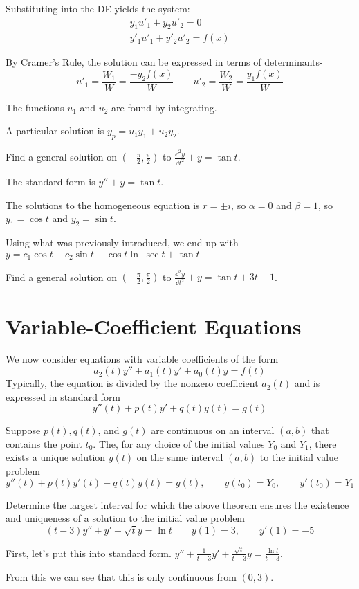 \documentclass[../diffeq.tex]{subfiles}
\begin{document}
Substituting into the DE yields the system:
\begin{align*}
y_1u'_1+y_2u'_2=0 \\
y'_1u'_1+y'_2u'_2 = f(x)
\end{align*}

By Cramer's Rule, the solution can be expressed in terms of determinants- 
\[ u'_1=\frac{W_1}{W}=\frac{-y_2f(x)}{W} \qquad u'_2=\frac{W_2}{W}=\frac{y_1f(x)}{W} \]

The functions $u_1$ and $u_2$ are found by integrating.

A particular solution is $y_p=u_1y_1+u_2y_2$.

\begin{example}
    Find a general solution on $(-\frac{\pi}{2},\frac{\pi}{2})$ to $\frac{\dd^2 y}{\dd t^2}+y=\tan t$.

    The standard form is $y''+y=\tan t$.

    The solutions to the homogeneous equation is $r=\pm i$, so $\alpha = 0$ and $\beta = 1$, so $y_1=\cos t$ and $y_2=\sin t$.

    Using what was previously introduced, we end up with $y=c_1\cos t + c_2\sin t - \cos t \ln|\sec t+\tan t|$
\end{example}

\ex Find a general solution on $(-\frac{\pi}{2},\frac{\pi}{2})$ to $\frac{\dd^2 y}{\dd t^2}+y=\tan t + 3t - 1$.

\section{Variable-Coefficient Equations}
We now consider equations with variable coefficients of the form 
\[ a_2(t)y''+a_1(t)y'+a_0(t)y=f(t) \]
Typically, the equation is divided by the nonzero coefficient $a_2(t)$ and is expressed in standard form 
\[ y''(t)+p(t)y'+q(t)y(t)=g(t) \]

\begin{theorem}
    Suppose $p(t), q(t)$, and $g(t)$ are continuous on an interval $(a,b)$ that contains the point $t_0$. The, for any choice of the initial values $Y_0$ and $Y_1$, there exists a 
    unique solution $y(t)$ on the same interval $(a,b)$ to the initial value problem 
    \[ y''(t)+p(t)y'(t)+q(t)y(t)=g(t), \qquad y(t_0)=Y_0, \qquad y'(t_0)=Y_1 \]
\end{theorem}

\begin{example}
    Determine the largest interval for which the above theorem ensures the existence and uniqueness of a solution to the initial value problem 
    \[(t-3)y'' + y'+\sqrt{t}y = \ln t \qquad y(1)=3, \qquad y'(1)=-5 \]

    First, let's put this into standard form. $y''+\frac{1}{t-3}y' + \frac{\sqrt{t}}{t-3}y=\frac{\ln t}{t-3}$.

    From this we can see that this is only continuous from $(0,3)$.
\end{example}
\end{document}
